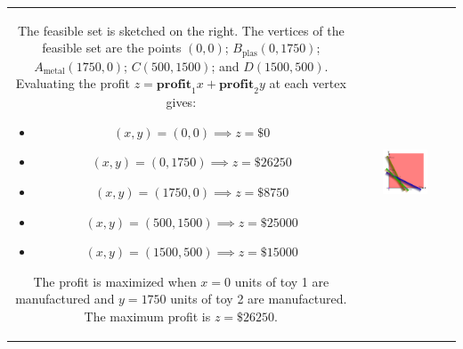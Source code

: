 \documentclass{article}
\begin{document}
\begin{tabular}{cc}
\parbox{0.5\textwidth}{
The feasible set is sketched on the right. The vertices of the feasible set are the points \((0, 0)\); \(B_\text{plas}(0, 1750)\); \(A_\text{metal}(1750, 0)\); \(C(500, 1500)\); and \(D(1500, 500)\). Evaluating the profit \(z = \textbf{profit}_1x + \textbf{profit}_2y\) at each vertex gives:
\begin{itemize}
\item \((x, y) = (0, 0) \implies z = \$0\)
\item \((x, y) = (0, 1750) \implies z = \$26250\)
\item \((x, y) = (1750, 0) \implies z = \$8750\)
\item \((x, y) = (500, 1500) \implies z = \$25000\)
\item \((x, y) = (1500, 500) \implies z = \$15000\)
\end{itemize}
The profit is maximized when \(x = 0\) units of toy 1 are manufactured and \(y = 1750\) units of toy 2 are manufactured. The maximum profit is \(z = \$26250\). 
} & \parbox{0.5\textwidth}{
\includegraphics[width = 0.5\textwidth]{feasible_set_application}
}
\end{tabular}
\end{document}
